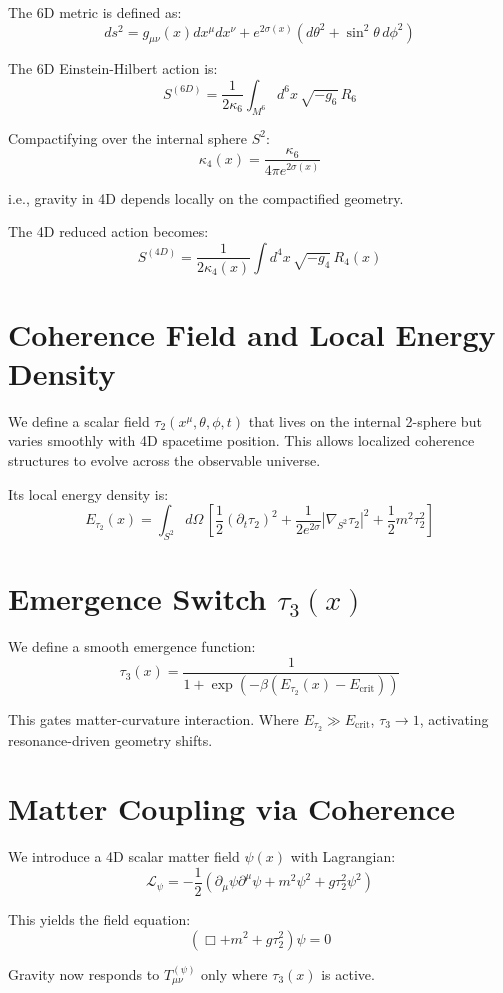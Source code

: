 \documentclass[12pt]{article}
\begin{document}
The 6D metric is defined as:
\[
ds^2 = g_{\mu\nu}(x) dx^\mu dx^\nu + e^{2\sigma(x)} (d\theta^2 + \sin^2\theta\, d\phi^2)
\]

The 6D Einstein-Hilbert action is:
\[
S^{(6D)} = \frac{1}{2\kappa_6} \int_{M^6} d^6x\, \sqrt{-g_6}\, R_6
\]

Compactifying over the internal sphere $S^2$:
\[
\kappa_4(x) = \frac{\kappa_6}{4\pi e^{2\sigma(x)}}
\]

i.e., gravity in 4D depends locally on the compactified geometry.

The 4D reduced action becomes:
\[
S^{(4D)} = \frac{1}{2\kappa_4(x)} \int d^4x\, \sqrt{-g_4}\, R_4(x)
\]

\section{Coherence Field and Local Energy Density}
We define a scalar field $\tau_2(x^\mu, \theta, \phi, t)$ that lives on the internal 2-sphere but varies smoothly with 4D spacetime position. This allows localized coherence structures to evolve across the observable universe.

Its local energy density is:
\[
E_{\tau_2}(x) = \int_{S^2} d\Omega\, \left[ \frac{1}{2}(\partial_t \tau_2)^2 + \frac{1}{2e^{2\sigma}} |\nabla_{S^2}\tau_2|^2 + \frac{1}{2} m^2 \tau_2^2 \right]
\]

\section{Emergence Switch $\tau_3(x)$}
We define a smooth emergence function:
\[
\tau_3(x) = \frac{1}{1 + \exp\left(-\beta (E_{\tau_2}(x) - E_{\text{crit}})\right)}
\]

This gates matter-curvature interaction. Where $E_{\tau_2} \gg E_{\text{crit}}$, $\tau_3 \to 1$, activating resonance-driven geometry shifts.

\section{Matter Coupling via Coherence}
We introduce a 4D scalar matter field $\psi(x)$ with Lagrangian:
\[
\mathcal{L}_\psi = -\frac{1}{2} \left( \partial_\mu \psi \partial^\mu \psi + m^2 \psi^2 + g \tau_2^2 \psi^2 \right)
\]

This yields the field equation:
\[
(\Box + m^2 + g \tau_2^2) \psi = 0
\]

Gravity now responds to $T_{\mu\nu}^{(\psi)}$ only where $\tau_3(x)$ is active.
\end{document}
